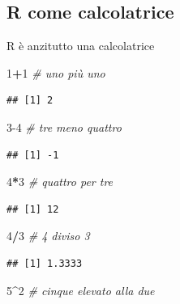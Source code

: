 \documentclass[
  11pt,
]{book}
\newenvironment{Shaded}{\begin{snugshade}}{\end{snugshade}}
\newcommand{\CommentTok}[1]{\textcolor[rgb]{0.56,0.35,0.01}{\textit{#1}}}
\newcommand{\DecValTok}[1]{\textcolor[rgb]{0.00,0.00,0.81}{#1}}
\newcommand{\SpecialCharTok}[1]{\textcolor[rgb]{0.81,0.36,0.00}{\textbf{#1}}}
\theoremstyle{mytheoremstyle}
\theoremstyle{mydefstyle}
\begin{document}
\subsection{R come calcolatrice}\label{r-come-calcolatrice}

R è anzitutto una calcolatrice

\begin{Shaded}
\begin{Highlighting}[]
\DecValTok{1}\SpecialCharTok{+}\DecValTok{1} \CommentTok{\# uno più uno }
\end{Highlighting}
\end{Shaded}

\begin{verbatim}
## [1] 2
\end{verbatim}

\begin{Shaded}
\begin{Highlighting}[]
\DecValTok{3{-}4} \CommentTok{\# tre meno quattro}
\end{Highlighting}
\end{Shaded}

\begin{verbatim}
## [1] -1
\end{verbatim}

\begin{Shaded}
\begin{Highlighting}[]
\DecValTok{4}\SpecialCharTok{*}\DecValTok{3} \CommentTok{\# quattro per tre}
\end{Highlighting}
\end{Shaded}

\begin{verbatim}
## [1] 12
\end{verbatim}

\begin{Shaded}
\begin{Highlighting}[]
\DecValTok{4}\SpecialCharTok{/}\DecValTok{3} \CommentTok{\# 4 diviso 3}
\end{Highlighting}
\end{Shaded}

\begin{verbatim}
## [1] 1.3333
\end{verbatim}

\begin{Shaded}
\begin{Highlighting}[]
\DecValTok{5}\SpecialCharTok{\^{}}\DecValTok{2} \CommentTok{\# cinque elevato alla due}
\end{Highlighting}
\end{Shaded}
\end{document}
